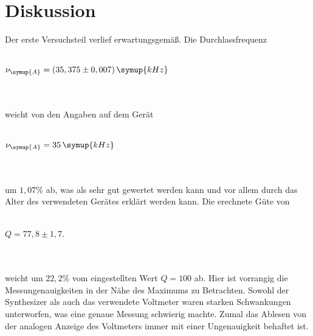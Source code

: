 \section{Diskussion}
\label{sec:Diskussion}
Der erste Versuchsteil verlief erwartungsgemäß. Die Durchlassfrequenz
\\ \\
\centerline{$\nu_{\symup{A}} = (35,375 \pm 0,007) \, \symup{kHz}$}
\\ \\
weicht von den Angaben auf dem Gerät 
\\ \\
\centerline{$\nu_{\symup{A}} = 35 \, \symup{kHz}$}
\\ \\ 
um $1,07 \%$ ab, was als sehr gut gewertet werden kann und vor allem durch das Alter des verwendeten Gerätes erklärt werden kann.
Die erechnete Güte von 
\\ \\
\centerline{$Q = 77,8 \pm 1,7 $.}    
\\ \\
weicht um $22,2 \%$ vom eingestellten Wert $Q = 100$ ab. Hier ist vorrangig die Messungenauigkeiten in der Nähe des Maximums zu Betrachten. 
Sowohl der Synthesizer als auch das verwendete Voltmeter waren starken Schwankungen unterworfen, was eine genaue Messung schwierig machte.
Zumal das Ablesen von der analogen Anzeige des Voltmeters immer mit einer Ungenauigkeit behaftet ist.

